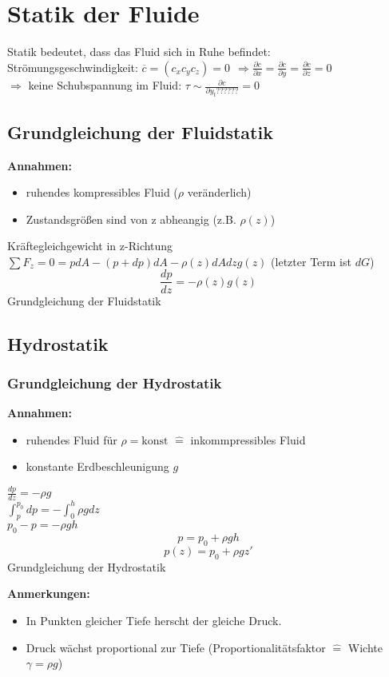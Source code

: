 \documentclass[10pt,a4paper]{article}
\begin{document}
\section{Statik der Fluide}

Statik bedeutet, dass das Fluid sich in Ruhe befindet: \\
Strömungsgeschwindigkeit: $\overline{c} = (c_x c_y c_z) = 0 ~~ \Rightarrow \frac{\partial c}{\partial x} = \frac{\partial c}{\partial y} = \frac{\partial c}{\partial z} = 0$ \\
$\Rightarrow$ keine Schubspannung im Fluid: $\tau \sim \frac{\partial c}{\partial y_t ??????} = 0$

\subsection{Grundgleichung der Fluidstatik}

\textbf{Annahmen:}
\begin{itemize}
\item ruhendes kompressibles Fluid ($\rho$ veränderlich)
\item Zustandsgrößen sind von z abheangig (z.B. $\rho (z)$) \\
\end{itemize}

Kräftegleichgewicht in z-Richtung \\
$\sum F_z = 0 = p dA - (p + dp) dA - \rho(z) dA dz g(z)$ (letzter Term ist $dG$) %
\[ \frac{dp}{dz} = -\rho(z) g(z) \]
Grundgleichung der Fluidstatik

\subsection{Hydrostatik}
\subsubsection{Grundgleichung der Hydrostatik}
\textbf{Annahmen:}
\begin{itemize}
\item ruhendes Fluid für $\rho = \text{konst}$ $\widehat{=}$ inkommpressibles Fluid
\item konstante Erdbeschleunigung $g$
\end{itemize}

$\frac{dp}{dz} = - \rho g$ \\
$\int_p^{p_0} dp = - \int_0^h \rho g dz$ \\
$p_0 - p = - \rho g h$ \\
\[ p = p_0 + \rho g h \]
\[ p(z) = p_0 + \rho g z' \]
Grundgleichung der Hydrostatik

\textbf{Anmerkungen:}
\begin{itemize}
\item In Punkten gleicher Tiefe herscht der gleiche Druck.
\item Druck wächst proportional zur Tiefe (Proportionalitätsfaktor $\widehat{=}$ Wichte $\gamma = \rho g$)
\end{itemize}
\end{document}
